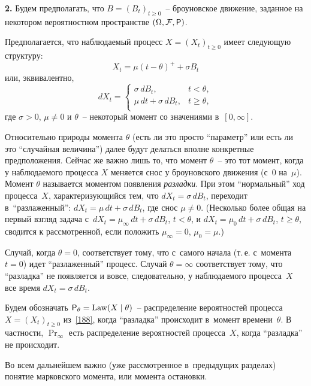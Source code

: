 \textbf{2.} Будем предполагать, что $B=(B_t)_{t\ge0}$~--
броуновское движение, заданное на некотором вероятностном
пространстве $\left(\Omega,\F,\Pr\right)$.

Предполагается, что наблюдаемый процесс $X=(X_t)_{t\ge0}$ имеет
следующую структуру:
\begin{equation}
\label{188}%
X_t=\mu(t-\theta)^{+}+\sigma B_t
\end{equation}
или, эквивалентно,
\begin{equation}
\label{189}%
dX_t=\left\{%
\begin{array}{ll}
\sigma\,dB_t,         & t<\theta, \\
\mu\,dt+\sigma\,dB_t, & t\ge\theta, \\
\end{array}%
\right.
\end{equation}
где $\sigma>0$, $\mu\neq0$ и $\theta$~-- некоторый момент со
значениями в~$[0,\infty]$.

Относительно природы момента $\theta$ (есть ли это просто
``параметр'' или есть ли это ``случайная величина'') далее будут
делаться вполне конкретные предположения. Сейчас же важно лишь то,
что момент $\theta$~-- это тот момент, когда у наблюдаемого
процесса $X$ меняется снос у броуновского движения (с~$0$
на~$\mu$). Момент $\theta$ называется моментом появления
\textit{разладки}. При этом ``нормальный'' ход процесса~$X$,
характеризующийся тем, что $dX_t=\sigma\,dB_t$, переходит
в~``разлаженный'': $dX_t=\mu\,dt+\sigma\,dB_t$, где снос
$\mu\ne0$. (Несколько более общая на первый взгляд задача
с~$dX_t=\mu_\infty\,dt+\sigma\,dB_t$, $t<\theta$, и
$dX_t=\mu_0\,dt+\sigma\,dB_t$, $t\ge\theta$, сводится к
рассмотренной, если положить $\mu_\infty=0$, $\mu_0=\mu$.)

Случай, когда $\theta=0$, соответствует тому, что с~самого начала
(т.\,е. с~момента~$t=0$) идет ``разлаженный'' процесс. Случай
$\theta=\infty$ соответствует тому, что ``разладка'' не появляется
и вовсе, следовательно, у наблюдаемого процесса~$X$ все время
$dX_t=\sigma\,dB_t$.

Будем обозначать $\Pr_{\theta}=\Law(X\mid\theta)$~-- распределение
вероятностей процесса $X=(X_t)_{t\ge0}$ из~\eqref{188}, когда
``разладка'' происходит в~момент времени~$\theta$. В частности,
$\Pr_{\infty}$ есть распределение вероятностей процесса~$X$, когда
``разладка'' не происходит.

Во всем дальнейшем важно (уже рассмотренное в~предыдущих разделах)
понятие марковского момента, или момента остановки.

